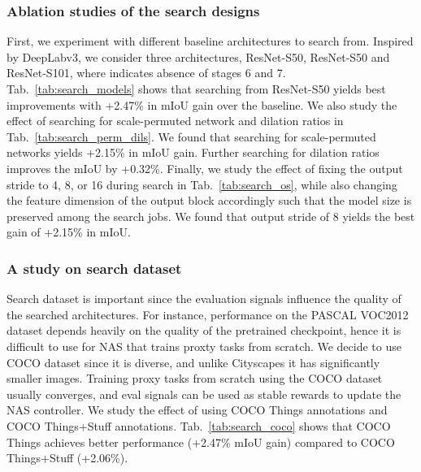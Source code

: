 \documentclass[10pt,twocolumn,letterpaper]{article}
\begin{document}
\subsubsection{Ablation studies of the search designs}
First, we experiment with different baseline architectures to search from. Inspired by DeepLabv3, we consider three architectures, ResNet-S50, ResNet-S50 and ResNet-S101, where  indicates absence of stages 6 and 7. Tab.~\ref{tab:search_models} shows that searching from ResNet-S50 yields best improvements with +2.47\% in mIoU gain over the baseline.
We also study the effect of searching for scale-permuted network and dilation ratios in Tab.~\ref{tab:search_perm_dils}. We found that searching for scale-permuted networks yields +2.15\% in mIoU gain. Further searching for dilation ratios improves the mIoU by +0.32\%.
Finally, we study the effect of fixing the output stride to 4, 8, or 16 during search in Tab.~\ref{tab:search_os}, while also changing the feature dimension of the output block accordingly such that the model size is preserved among the search jobs. We found that output stride of 8 yields the best gain of +2.15\% in mIoU.

\subsubsection{A study on search dataset}
Search dataset is important since the evaluation signals influence the quality of the searched architectures. For instance, performance on the PASCAL VOC2012 dataset depends heavily on the quality of the pretrained checkpoint, hence it is difficult to use for NAS that trains proxty tasks from scratch. We decide to use COCO dataset since it is diverse, and unlike Cityscapes it has significantly smaller images. Training proxy tasks from scratch using the COCO dataset usually converges, and eval signals can be used as stable rewards to update the NAS controller. We study the effect of using COCO Things annotations and COCO Things+Stuff annotations. Tab.~\ref{tab:search_coco} shows that COCO Things achieves better performance (+2.47\% mIoU gain) compared to COCO Things+Stuff (+2.06\%).
\end{document}
